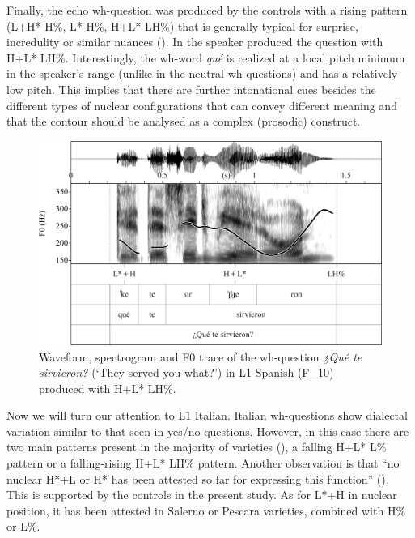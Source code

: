 \begin{sloppypar}
Finally, the echo wh-question was produced by the controls with a rising pattern (L+H* H\%, L* H\%, H+L* LH\%) that is generally typical for surprise, incredulity or similar nuances (\citealt[382]{HualdePrieto2015}). In  the speaker produced the question with H+L* LH\%. Interestingly, the wh-word \textit{qué} is realized at a local pitch minimum in the speaker’s range (unlike in the neutral wh-questions) and has a relatively low pitch. This implies that there are further intonational cues besides the different types of nuclear configurations that can convey different meaning and that the contour should be analysed as a complex (prosodic) construct.
\end{sloppypar}

\begin{figure}


\includegraphics[width=\textwidth]{figures/Figure_4.96.png}



\caption{Waveform, spectrogram and F0 trace of the wh-question \textit{¿Qué te sirvieron?} (‘They served you what?’) in L1 Spanish (\mbox{F\_10}) produced with H+L* LH\%.}
\label{fig:4.96}
\end{figure}


Now we will turn our attention to L1 Italian. Italian wh-questions show dialectal variation similar to that seen in yes/no questions. However, in this case there are two main patterns present in the majority of varieties (\citealt{GiliFivelaEtAl2015}), a falling H+L* L\% pattern or a falling-rising H+L* LH\% pattern. Another observation is that “no nuclear H*+L or H* has been attested so far for expressing this function” (\citealt[178]{GiliFivelaEtAl2015}). This is supported by the controls in the present study. As for L*+H in nuclear position, it has been attested in Salerno or Pescara varieties, combined with H\% or L\%.



